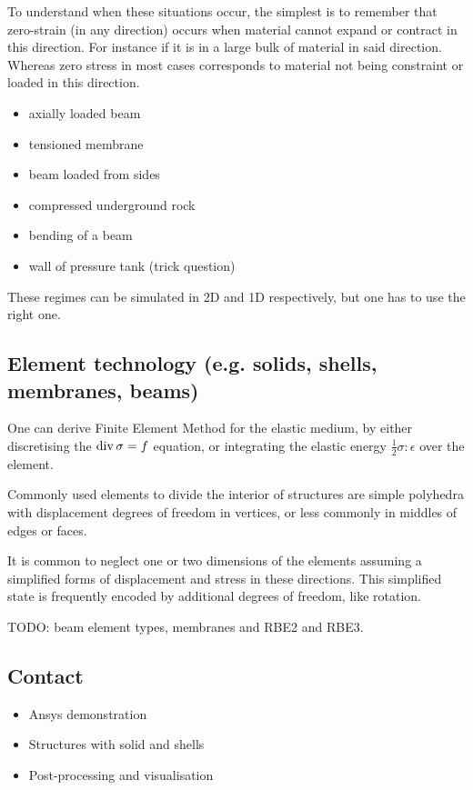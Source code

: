 \documentclass[12pt]{article}
\begin{document}
To understand when these situations occur, the simplest is to remember that zero-strain (in any direction) occurs when material cannot expand or contract in this direction. For instance if it is in a large bulk of material in said direction. Whereas zero stress in most cases corresponds to material not being constraint or loaded in this direction.
\begin{itemize}
    \item axially loaded beam
    \item tensioned membrane
    \item beam loaded from sides
    \item compressed underground rock
    \item bending of a beam
    \item wall of pressure tank (trick question)
\end{itemize}

These regimes can be simulated in 2D and 1D respectively, but one has to use the right one.

\subsection{Element technology (e.g. solids, shells, membranes, beams)}

One can derive Finite Element Method for the elastic medium, by either discretising the $\operatorname{div}\sigma=f$ equation, or integrating the elastic energy $\frac{1}{2}\sigma:\epsilon$ over the element.

Commonly used elements to divide the interior of structures are simple polyhedra with displacement degrees of freedom in vertices, or less commonly in middles of edges or faces.

It is common to neglect one or two dimensions of the elements assuming a simplified forms of displacement and stress in these directions. This simplified state is frequently encoded by additional degrees of freedom, like rotation.

TODO: beam element types, membranes and RBE2 and RBE3.

\newpage


\subsection*{Contact}
\begin{itemize}
    \item Ansys demonstration
    \item Structures with solid and shells
    \item Post-processing and visualisation
\end{itemize}
\end{document}
